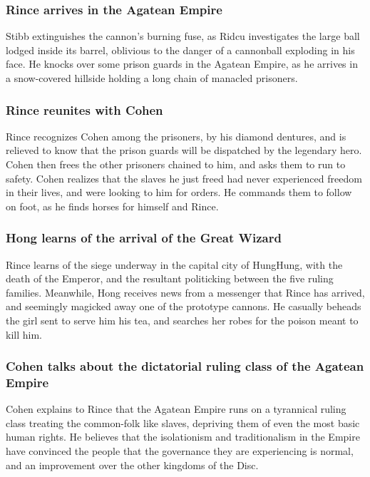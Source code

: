 \subsubsection{\Gls{Rince} arrives in the Agatean Empire}
\Gls{Stibb} extinguishes the cannon's burning fuse, as \Gls{Ridcu} investigates the large ball
lodged inside its barrel, oblivious to the danger of a cannonball exploding in his face. He knocks
over some prison guards in the Agatean Empire, as he arrives in a snow-covered hillside holding a
long chain of manacled prisoners.

\subsubsection{\Gls{Rince} reunites with \Gls{Cohen}}
\Gls{Rince} recognizes \Gls{Cohen} among the prisoners, by his diamond dentures, and is relieved to
know that the prison guards will be dispatched by the legendary hero. \Gls{Cohen} then frees the
other prisoners chained to him, and asks them to run to safety. \Gls{Cohen} realizes that the slaves
he just freed had never experienced freedom in their lives, and were looking to him for orders. He
commands them to follow on foot, as he finds horses for himself and \Gls{Rince}.

\subsubsection{\Gls{Hong} learns of the arrival of the Great Wizard}
\Gls{Rince} learns of the siege underway in the capital city of HungHung, with the death of the
Emperor, and the resultant politicking between the five ruling families. Meanwhile, \Gls{Hong}
receives news from a messenger that \Gls{Rince} has arrived, and seemingly magicked away one of the
prototype cannons. He casually beheads the girl sent to serve him his tea, and searches her robes
for the poison meant to kill him.

\subsubsection{\Gls{Cohen} talks about the dictatorial ruling class of the Agatean Empire}
\Gls{Cohen} explains to \Gls{Rince} that the Agatean Empire runs on a tyrannical ruling class
treating the common-folk like slaves, depriving them of even the most basic human rights. He
believes that the isolationism and traditionalism in the Empire have convinced the people that the
governance they are experiencing is normal, and an improvement over the other kingdoms of the Disc.

